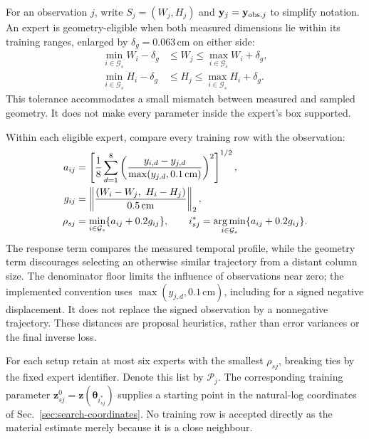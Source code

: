 For an observation $j$, write $S_j=(W_j,H_j)$ and
$\mathbf y_j=\mathbf y_{{\rm obs},j}$ to simplify notation.
An expert is geometry-eligible when both measured dimensions lie within
its training ranges, enlarged by $\delta_g=0.063$\,cm on either side:
\begin{equation}
\label{eq:inverse-geometry-screen}
\begin{aligned}
 \min_{i\in\mathcal G_s}W_i-\delta_g
 &\leq W_j\leq\max_{i\in\mathcal G_s}W_i+\delta_g,\\
 \min_{i\in\mathcal G_s}H_i-\delta_g
 &\leq H_j\leq\max_{i\in\mathcal G_s}H_i+\delta_g.
\end{aligned}
\end{equation}
This tolerance accommodates a small mismatch between measured and sampled
geometry. It does not make every parameter inside the expert's box supported.

Within each eligible expert, compare every training row with the observation:
\begin{equation}
\label{eq:inverse-preselection-score}
\begin{aligned}
 a_{ij}&=\left[\frac18\sum_{d=1}^{8}
  \left(\frac{y_{i,d}-y_{j,d}}
  {\max(y_{j,d},0.1\,\mathrm{cm})}\right)^2\right]^{1/2},\\
 g_{ij}&=\left\|\frac{(W_i-W_j,\ H_i-H_j)}{0.5\,\mathrm{cm}}\right\|_2,\\
 \rho_{sj}&=\min_{i\in\mathcal G_s}\{a_{ij}+0.2g_{ij}\},\qquad
 i^*_{sj}=\mathop{\rm arg\,min}_{i\in\mathcal G_s}
             \{a_{ij}+0.2g_{ij}\}.
\end{aligned}
\end{equation}
The response term compares the measured temporal profile, while the geometry
term discourages selecting an otherwise similar trajectory from a distant
column size. The denominator floor limits the influence of observations near
zero; the implemented convention uses $\max(y_{j,d},0.1\,\mathrm{cm})$,
including for a signed negative displacement. It does not replace the signed
observation by a nonnegative trajectory. These distances are proposal
heuristics, rather than error variances or the final inverse loss.

For each setup retain at most six experts with the smallest $\rho_{sj}$,
breaking ties by the fixed expert identifier. Denote this list by
$\mathcal P_j$. The corresponding training parameter
$\mathbf z^0_{sj}=\mathbf z(\boldsymbol\theta_{i^*_{sj}})$ supplies a
starting point in the natural-log coordinates of
Sec.~\ref{sec:search-coordinates}. No training row is accepted directly
as the material estimate merely because it is a close neighbour.

